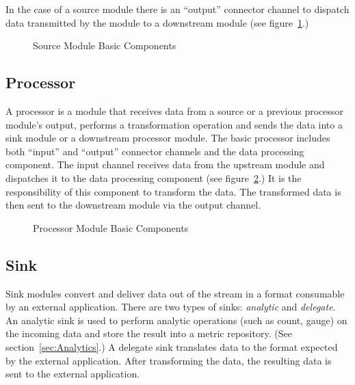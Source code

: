 \par

In the case of a source module there is an ``output'' connector channel to dispatch data
transmitted by the module to a downstream module (see figure~\ref{fig:sourcembc}.)

\par

\begin{figure}[ht]
\centering
{}
\caption{Source Module Basic Components}
\label{fig:sourcembc}
\end{figure}

\par

\subsection{Processor}
\label{sec:Processor}
A processor is a module that receives data from a source or a previous processor
module's output, performs a transformation operation and sends the data
into a sink module or a downstream processor module. The basic processor
includes both ``input'' and ``output'' connector channels and the data processing component.
The input channel receives data from the upstream module and dispatches it to
the data processing component (see figure~\ref{fig:processormbc}.) It is the responsibility of
this component to transform the data. The transformed data is then sent to the downstream module
via the output channel.

\par

\begin{figure}
\centering
{}
\caption{Processor Module Basic Components}
\label{fig:processormbc}
\end{figure}

\par

\subsection{Sink}
\label{sec:Sink}
Sink modules convert and deliver data out of the stream in a format consumable by
an external application.  There are two types of sinks: \emph{analytic} and \emph{delegate}.
An analytic sink is used to perform analytic operations (such as count, gauge) on the
incoming data and store the result into a metric repository. (See section~\ref{sec:Analytics}.)
A delegate sink translates data to the format expected by the external application.
After transforming the data, the resulting data is sent to the external application.

